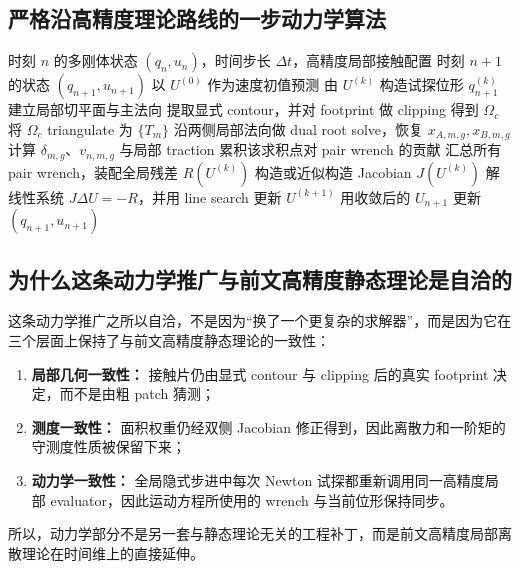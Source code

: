 \documentclass[12pt,a4paper]{ctexart}
\begin{document}
\subsection{严格沿高精度理论路线的一步动力学算法}

\begin{algorithm}[H]
\caption{基于 $B_{\mathrm{sdf\_quad\_sheet}}$ 的一步隐式动力学推进}
\begin{algorithmic}[1]
\Require 时刻 $n$ 的多刚体状态 $(q_n,u_n)$，时间步长 $\Delta t$，高精度局部接触配置
\Ensure 时刻 $n+1$ 的状态 $(q_{n+1},u_{n+1})$
\State 以 $U^{(0)}$ 作为速度初值预测
    \State 由 $U^{(k)}$ 构造试探位形 $q^{(k)}_{n+1}$
        \State 建立局部切平面与主法向
        \State 提取显式 contour，并对 footprint 做 clipping 得到 $\Omega_c$
        \State 将 $\Omega_c$ triangulate 为 $\{T_m\}$
            \State 沿两侧局部法向做 dual root solve，恢复 $x_{A,m,g},x_{B,m,g}$
            \State 计算 $\delta_{m,g}$、$v_{n,m,g}$ 与局部 traction
            \State 累积该求积点对 pair wrench 的贡献
        \EndFor
    \EndFor
    \State 汇总所有 pair wrench，装配全局残差 $R(U^{(k)})$
    \State 构造或近似构造 Jacobian $J(U^{(k)})$
    \State 解线性系统 $J\Delta U=-R$，并用 line search 更新 $U^{(k+1)}$
\EndFor
\State 用收敛后的 $U_{n+1}$ 更新 $(q_{n+1},u_{n+1})$
\end{algorithmic}
\end{algorithm}

\subsection{为什么这条动力学推广与前文高精度静态理论是自洽的}

这条动力学推广之所以自洽，不是因为“换了一个更复杂的求解器”，而是因为它在三个层面上保持了与前文高精度静态理论的一致性：
\begin{enumerate}
    \item \textbf{局部几何一致性：} 接触片仍由显式 contour 与 clipping 后的真实 footprint 决定，而不是由粗 patch 猜测；
    \item \textbf{测度一致性：} 面积权重仍经双侧 Jacobian 修正得到，因此离散力和一阶矩的守测度性质被保留下来；
    \item \textbf{动力学一致性：} 全局隐式步进中每次 Newton 试探都重新调用同一高精度局部 evaluator，因此运动方程所使用的 wrench 与当前位形保持同步。
\end{enumerate}
所以，动力学部分不是另一套与静态理论无关的工程补丁，而是前文高精度局部离散理论在时间维上的直接延伸。
\end{document}
